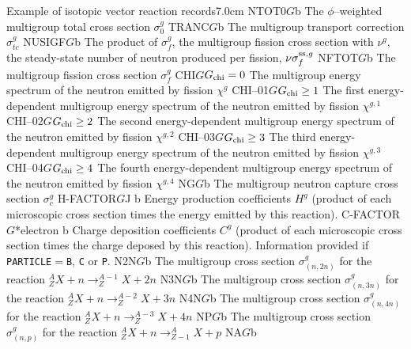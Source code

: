 \begin{DescriptionEnregistrement}{Example of isotopic vector reaction records}{7.0cm}
\label{tabl:tabiso4}
\RealEnr
  {NTOT0}{$G$}{b}
  {The $\phi$--weighted multigroup total cross section $\sigma_0^{g}$}
\RealEnr
  {TRANC}{$G$}{b} 
  {The multigroup transport correction $\sigma_{tc}^{g}$}
\RealEnr
  {NUSIGF}{$G$}{b} 
  {The product of $\sigma_{f}^{g}$, the multigroup fission cross section with
   $\nu^{g}$, the steady-state number of neutron produced per fission,
   $\nu\sigma_{f}^{{\rm ss},g}$}
\RealEnr
  {NFTOT}{$G$}{b}
  {The multigroup fission cross section $\sigma_{f}^{g}$}
\OptRealEnr
  {CHI}{$G$}{$G_{\rm chi}=0$}{}
  {The multigroup energy spectrum of the neutron emitted by fission $\chi^{g}$}
\OptRealEnr
  {CHI--01}{$G$}{$G_{\rm chi}\ge 1$}{}
  {The first energy-dependent multigroup energy spectrum of the neutron emitted by fission $\chi^{g,1}$}
\OptRealEnr
  {CHI--02}{$G$}{$G_{\rm chi}\ge 2$}{}
  {The second energy-dependent multigroup energy spectrum of the neutron emitted by fission $\chi^{g,2}$}
\OptRealEnr
  {CHI--03}{$G$}{$G_{\rm chi}\ge 3$}{}
  {The third energy-dependent multigroup energy spectrum of the neutron emitted by fission $\chi^{g,3}$}
\OptRealEnr
  {CHI--04}{$G$}{$G_{\rm chi}\ge 4$}{}
  {The fourth energy-dependent multigroup energy spectrum of the neutron emitted by fission $\chi^{g,4}$}
\RealEnr
  {NG}{$G$}{b} 
  {The multigroup neutron capture cross section $\sigma_{c}^{g}$}
\RealEnr
  {H-FACTOR}{$G$}{J b}
  {Energy production coefficients $H^{g}$ (product of each microscopic cross section
  times the energy emitted by this reaction).}
\OptRealEnr
  {C-FACTOR}{$G$}{*}{electron b}
  {Charge deposition coefficients $C^{g}$ (product of each microscopic cross section
  times the charge deposed by this reaction). Information provided if {\tt PARTICLE}$=${\tt B}, {\tt C} or {\tt P}.}
\RealEnr
  {N2N}{$G$}{b} 
  {The multigroup cross section
   $\sigma_{(n,2n)}^{g}$ for the reaction 
   $^{A}_{Z}X+n \to ^{A-1}_{Z}X+2n$}
\RealEnr
  {N3N}{$G$}{b} 
  {The multigroup cross section
   $\sigma_{(n,3n)}^{g}$ for the reaction 
   $^{A}_{Z}X+n \to ^{A-2}_{Z}X+3n$}
\RealEnr
  {N4N}{$G$}{b} 
  {The multigroup cross section
   $\sigma_{(n,4n)}^{g}$ for the reaction 
   $^{A}_{Z}X+n \to ^{A-3}_{Z}X+4n$}
\RealEnr
  {NP}{$G$}{b}
  {The multigroup cross section
   $\sigma_{(n,p)}^{g}$ for the reaction 
   $^{A}_{Z}X+n \to ^{A}_{Z-1}X+p$}
\RealEnr
  {NA}{$G$}{b}

\end{DescriptionEnregistrement}
